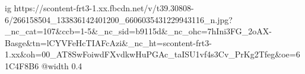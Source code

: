  
 
 
 
 

\ifcmt
  ig https://scontent-frt3-1.xx.fbcdn.net/v/t39.30808-6/266158504_133836142401200_6606035431229943116_n.jpg?_nc_cat=107&ccb=1-5&_nc_sid=b9115d&_nc_ohc=7hIni3FG_2oAX-Basge&tn=lCYVFeHcTIAFcAzi&_nc_ht=scontent-frt3-1.xx&oh=00_AT8SwFoiwdFXvdkwHuPGAc_taISU1vf4s3Cv_PrKg2Tfeg&oe=61C4F8B6
  @width 0.4
\fi
